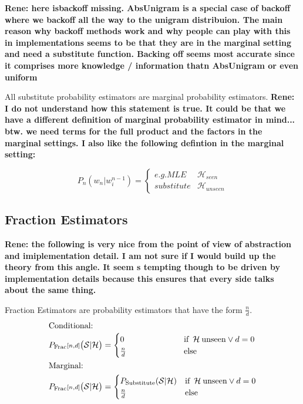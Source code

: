 \documentclass[11pt,a4paper]{article}
\newcommand{\Seq}{\mathcal{S}}
\newcommand{\Hist}{\mathcal{H}}
\newcommand{\rp}[1]{\textbf{Rene: #1}}
\begin{document}
  \rp{here isbackoff missing. AbsUnigram is a special case of backoff where we
  backoff all the way to the unigram distribuion. The main reason why backoff
  methods work and why people can play with this in implementations seems to be
  that they are in the marginal setting and need a substitute function. Backing
  off seems most accurate since it comprises more knowledge / information thatn
  AbsUnigram or even uniform}

  All substitute probability estimators are marginal probability estimators.
  \rp{I do not understand how this statement is true. It could be that we have a
  different definition of marginal probability estimator in mind... btw. we need
  terms for the full product and the factors in the marginal settings. I also
  like the following defintion in the marginal setting:}

  \begin{equation}
    P_n(w_n|w_i^{n-1})= \begin{cases}
      e.g. MLE & \Hist_{seen}  \\
      substitute & \Hist_{unseen}
    \end{cases}
  \end{equation}


  \subsection{Fraction Estimators}

  \rp{the following is very nice from the point of view of abstraction and
  imiplementation detail. I am not sure if I would build up the theory from this
  angle. It seem s tempting though to be driven by implementation details
  because this ensures that every side talks about the same thing.}

  Fraction Estimators are probability estimators that have the form $\frac{n}{d}$.
  \begin{alignat}{2}
    \intertext{Conditional:}
    P_\mathrm{Frac}{\scriptstyle[n , d]}\big(\Seq | \Hist\big) &= \begin{cases}
      0\hphantom{_\mathrm{Substitute}(\Seq | \Hist)} & \text{if} \enspace \Hist \: \mathrm{unseen} \lor d = 0 \\
      \frac{n}{d} & \text{else}
    \end{cases} \\
    \intertext{Marginal:}
    P_\mathrm{Frac}{\scriptstyle[n , d]}\big(\Seq | \Hist\big) &= \begin{cases}
      P_\mathrm{Substitute}(\Seq | \Hist) & \text{if} \enspace \Hist \: \mathrm{unseen} \lor d = 0 \\
      \frac{n}{d} & \text{else}
    \end{cases}
  \end{alignat}
\end{document}
